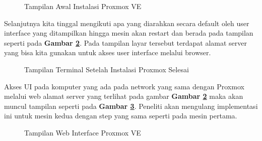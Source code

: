 \begin{figure}[H]
  \centering
  \caption{Tampilan Awal Instalasi Proxmox VE}
  \label{fig:proxmox_install_ui}
\end{figure}

Selanjutnya kita tinggal mengikuti apa yang diarahkan secara default oleh user
interface yang ditampilkan hingga mesin akan restart dan berada pada tampilan
seperti pada \textbf{Gambar \ref{fig:proxmox_terminal}}. Pada tampilan layar
tersebut terdapat alamat server yang bisa kita gunakan untuk akses user
interface melalui browser.
\begin{figure}[H]
  \centering
  \caption{Tampilan Terminal Setelah Instalasi Proxmox Selesai}
  \label{fig:proxmox_terminal}
\end{figure}

Akses UI pada komputer yang ada pada network yang sama dengan Proxmox melalui
web alamat server yang terlihat pada gambar \textbf{Gambar
  \ref{fig:proxmox_terminal}} maka akan muncul tampilan seperti pada
\textbf{Gambar \ref{fig:proxmox_webui}}. Peneliti akan mengulang implementasi
ini untuk mesin kedua dengan step yang sama seperti pada mesin pertama.
\begin{figure}[H]
  \centering
  \caption{Tampilan Web Interface Proxmox VE}
  \label{fig:proxmox_webui}
\end{figure}

